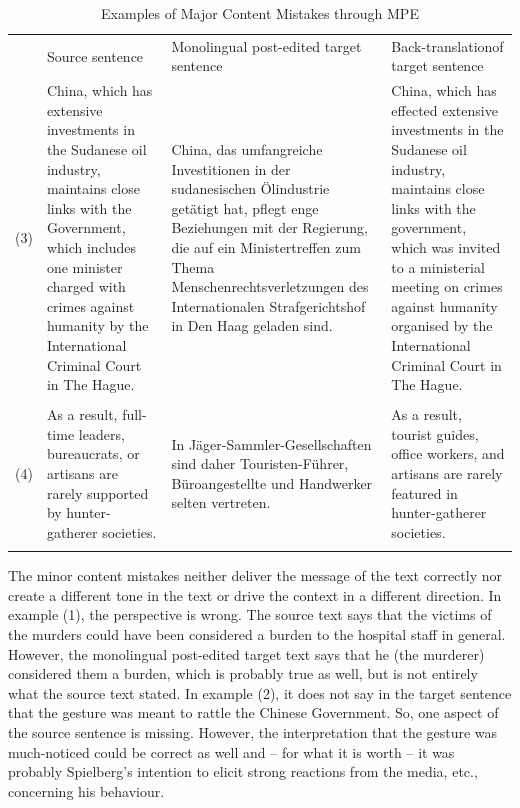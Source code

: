 \documentclass[output=paper]{langsci/langscibook}
\begin{document}
\begin{table}[t]
\begin{tabularx}{\textwidth}{lXp{3.6cm}p{3cm}} 
    & Source \newline sentence & Monolingual post-\newline edited target sentence & Back-translation\newline  of target sentence \\
\lsptoprule
(3) & China, which has extensive investments in the Sudanese oil industry, maintains close links with the Government, which includes one minister charged with crimes against humanity by the International Criminal Court in The Hague. & China, das umfangreiche Investitionen in der sudanesischen Ölindustrie getätigt hat, pflegt enge Beziehungen mit der Regierung, die auf ein Ministertreffen zum Thema Menschenrechtsverletzungen des Internationalen Strafgerichtshof in Den Haag geladen sind. & China, which has effected extensive investments in the Sudanese oil industry, maintains close links with the government, which was invited to a ministerial meeting on crimes against humanity organised by the International Criminal Court in The Hague.\\
\\
(4) & As a result, full-time leaders, bureaucrats, or artisans are rarely supported by hunter-gatherer societies. & In Jäger-Sammler-Gesellschaften sind daher Touristen-Führer, Büroangestellte und Handwerker selten vertreten. & As a result, tourist guides, office workers, and artisans are rarely featured in hunter-gatherer societies.\\
\lspbottomrule
\end{tabularx}
\caption{Examples of Major Content Mistakes through MPE}
\label{nitzke:tab:1b}
\end{table}

The minor content mistakes neither deliver the message of the text correctly nor create a different tone in the text or drive the context in a different direction. In example (1), the perspective is wrong. The source text says that the victims of the murders could have been considered a burden to the hospital staff in general. However, the monolingual post-edited target text says that he (the murderer) considered them a burden, which is probably true as well, but is not entirely what the source text stated. In example (2), it does not say in the target sentence that the gesture was meant to rattle the Chinese Government. So, one aspect of the source sentence is missing. However, the interpretation that the gesture was much-noticed could be correct as well and -- for what it is worth -- it was probably Spielberg's intention to elicit strong reactions from the media, etc., concerning his behaviour.
\end{document}
